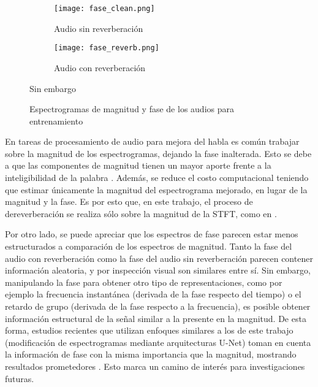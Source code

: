 \begin{figure}[H]
\centering
\begin{subfigure}{.5\textwidth}
  \centering
  \texttt{[image: fase\_clean.png]}
  \caption{Audio sin reverberación}
  \label{fig:fase_sub1}
\end{subfigure}%
\begin{subfigure}{.5\textwidth}
  \centering
  \texttt{[image: fase\_reverb.png]}
  \caption{Audio con reverberación}
  \label{fig:fase_sub2}
\end{subfigure}Sin embargo
\caption{Espectrogramas de magnitud y fase de los audios para entrenamiento}
\label{fig:fases}
\end{figure} 

En tareas de procesamiento de audio para mejora del habla es común trabajar sobre la magnitud de los espectrogramas, dejando la fase inalterada. Esto se debe a que las componentes de magnitud tienen un mayor aporte frente a la inteligibilidad de la palabra \cite{phase_book, unphase}. Además, se reduce el costo computacional teniendo que estimar únicamente la magnitud del espectrograma mejorado, en lugar de la magnitud y la fase.  Es por esto que, en este trabajo, el proceso de dereverberación se realiza sólo sobre la magnitud de la STFT, como en \cite{CNN, FCN, skip, rir_filtinverso}. 

Por otro lado, se puede apreciar que los espectros de fase parecen estar menos estructurados a comparación de los espectros de magnitud. Tanto la fase del audio con reverberación como la fase del audio sin reverberación parecen contener información aleatoria, y por inspección visual son similares entre sí. Sin embargo, manipulando la fase para obtener otro tipo de representaciones, como por ejemplo la frecuencia instantánea (derivada de la fase respecto del tiempo) o el retardo de grupo (derivada de la fase respecto a la frecuencia), es posible obtener información estructural de la señal similar a la presente en la magnitud. De esta forma, estudios recientes que utilizan enfoques similares a los de este trabajo (modificación de espectrogramas mediante arquitecturas U-Net) toman en cuenta la información de fase con la misma importancia que la magnitud, mostrando resultados prometedores \cite{phaseaware}. Esto marca un camino de interés para investigaciones futuras. 

